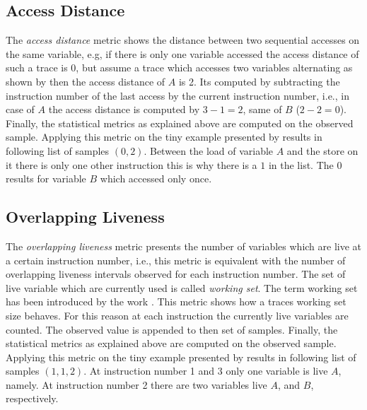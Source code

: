 \documentclass[onecolumn, openright, master, english, signatures]{dbrgrptt}
\begin{document}
\subsection{Access Distance}\label{ssec:metric-access-distance}
The \emph{access distance} metric shows the distance between two sequential accesses on the same variable, e.g, if there is only one variable accessed the access distance of such a \ac{trace} is 0, but assume a \ac{trace} which accesses two variables alternating as shown by  then the access distance of $A$ is 2. Its computed by subtracting the instruction number of the last access by the current instruction number, i.e., in case of $A$ the access distance is computed by $3-1 = 2$, same of $B$ ($2 - 2 = 0$). Finally, the statistical metrics as explained above are computed on the observed sample. Applying this metric on the tiny example presented by  results in following list of samples $(0, 2)$. Between the load of variable $A$ and the store on it there is only one other instruction this is why there is a $1$ in the list. The $0$ results for variable $B$ which accessed only once.

\subsection{Overlapping Liveness}\label{ssec:metric-concurrently-live}
The \emph{overlapping liveness} metric presents the number of variables which are live at a certain instruction number, i.e., this metric is equivalent with the number of overlapping liveness intervals observed for each instruction number. The set of live variable which are currently used is called \emph{working set}. The term working set has been introduced by the work \cite{denning1968working}. This metric shows how a \ac{trace}s working set size behaves. For this reason at each instruction the currently live variables are counted. The observed value is appended to then set of samples. Finally, the statistical metrics as explained above are computed on the observed sample. Applying this metric on the tiny example presented by  results in following list of samples $(1, 1, 2)$. At instruction number 1 and 3 only one variable is live $A$, namely. At instruction number 2 there are two variables live $A$, and $B$, respectively.
\end{document}
